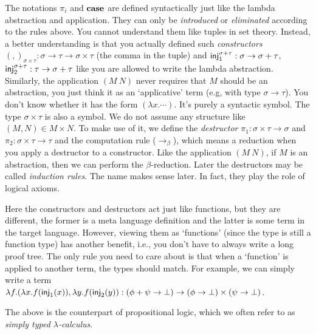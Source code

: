 \begin{caveat}
    \label{constructor-destructor}
    The notations $\pi_i$ and $\text{\bf case}$ are defined syntactically
    just like the lambda abstraction and application. They can only be
    {\it introduced} or {\it eliminated} according to the rules above. 
    You cannot understand them like tuples in set theory. Instead, a better
    understanding is that you actually defined such {\it constructors} 
    $(,)_{\sigma\times\tau}: \sigma\to\tau\to\sigma\times\tau$ (the comma
    in the tuple) and $\text{\sf inj}_1^{\sigma+\tau}: \sigma\to\sigma+\tau$, 
    $\text{\sf inj}_2^{\sigma+\tau}: \tau\to\sigma+\tau$ like you are allowed
    to write the lambda abstraction. Similarly, the application $(M\ N)$
    never requires that $M$ should be an abstraction, you just think it 
    as an `applicative' term (e.g, with type $\sigma\to\tau$). You don't 
    know whether it has the form $(\lambda x.\cdots)$. It's purely a
    syntactic symbol. The type $\sigma\times\tau$ is also a symbol. We
    do not assume any structure like $(M, N)\in M\times N$. To make
    use of it, we define the {\it destructor} $\pi_1:\sigma\times\tau\to\sigma$
    and $\pi_2:\sigma\times\tau\to\tau$ and the computation rule 
    ($\to_\beta$), which means a reduction when you apply a destructor 
    to a constructor. Like the application $(M\ N)$, if $M$ is an 
    abstraction, then we can perform the $\beta$-reduction. Later the 
    destructors may be called {\it induction rules}. The name makes 
    sense later. In fact, they play the role of logical axioms. 
\end{caveat}

\begin{remark}
    Here the constructors and destructors act just like functions,
    but they are different, the former is a meta language definition 
    and the latter is some term in the target language. However, viewing
    them as `functions' (since the type is still a function type) has 
    another benefit, i.e., you don't have to
    always write a long proof tree. The only rule you need to care about
    is that when a `function' is applied to another term, the types
    should match. For example, we can simply write a term
    $\lambda f.(\lambda x.f(\text{\sf inj}_1(x)),\lambda y.f(\text{\sf inj}_2(y)):
    (\phi+\psi\to\bot)\to(\phi\to\bot)\times(\psi\to\bot)$. 
\end{remark}

The above is the counterpart of propositional logic, which we often
refer to as {\it simply typed $\lambda$-calculus}. 


